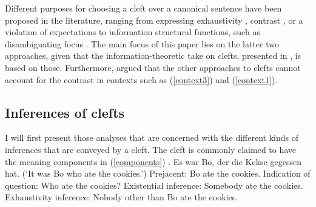 \documentclass[output=paper,colorlinks,citecolor=brown]{langscibook}
\begin{document}
Different purposes for choosing a cleft over a canonical sentence have been proposed in the literature, ranging from expressing exhaustivity \citep[e.g.,][]{horn_1981,buring_kriz_2013}, contrast \citep[e.g.,][]{rochemont_1986},  or a violation of expectations \citep[e.g.,][]{destruel_velleman_2014,tonnis_2021} to information structural functions, such as disambiguating focus \citep[e.g.,][]{deveaugh-geiss_et_al_2015,tonnis_et_al_2018}. The main focus of this paper lies on the latter two approaches, given that the information-theoretic take on clefts, presented in , is based on those. Furthermore, \citet{tonnis_tonhauser_2022} argued that the other approaches to clefts cannot account for the contrast in contexts such as (\ref{context3}) and (\ref{context1}). 


\subsection{Inferences of clefts}\label{sec:inferences}
I will first present those analyses that are concerned with the different kinds of inferences that are conveyed by a cleft. The cleft is commonly claimed to have the meaning components in (\ref{components}) \citep[e.g.,][]{velleman_et_al_2012,krifka_musan_2012,deveaugh-geiss_et_al_2018b,destruel_et_al_2019}.
\ea\label{components} Es war Bo, der die Kekse gegessen hat. (`It was Bo who ate the cookies.')
\ea\label{components-a}{Prejacent: Bo ate the cookies.}
\ex\label{components-b}{Indication of question: Who ate the cookies?}
\ex\label{components-c}{Existential inference: Somebody ate the cookies.}
\ex\label{components-d}{Exhaustivity inference: Nobody other than Bo ate the cookies.}
\z
\z
\end{document}
